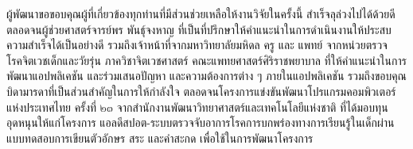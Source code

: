 \documentclass[12pt,oneside,openright,a4paper]{cpe-thai-project}
\begin{document}
\preface
ผู้พัฒนาขอขอบคุณผู้ที่เกี่ยวข้องทุกท่านที่มีส่วนช่วยเหลือให้งานวิจัยในครั้งนี้ สำเร็จลุล่วงไปได้ด้วยดี 
ตลอดจนผู้ช่วยศาสตร์จารย์พร พันธุ์จงหาญ ที่เป็นที่ปรึกษาให้คำแนะนำในการดำเนินงานให้ประสบความสำเร็จได้เป็นอย่างดี 
รวมถึงเจ้าหน้าที่จากมหาวิทยาลัยมหิดล ครู และ แพทย์ จากหน่วยตรวจโรคจิตเวชเด็กและวัยรุ่น ภาควิชาจิตเวชศาสตร์ คณะแพทยศาสตร์ศิริราชพยาบาล
 ที่ให้คำแนะนำในการพัฒนาแอปพลิเคชัน และร่วมเสนอปัญหา และความต้องการต่าง ๆ ภายในแอปพลิเคชัน  รวมถึงขอบคุณบิดามารดาที่เป็นส่วนสำคัญในการให้กำลังใจ ตลอดจนโครงการแข่งขันพัฒนาโปรแกรมคอมพิวเตอร์แห่งประเทศไทย ครั้งที่ ๒๓ 
จากสำนักงานพัฒนาวิทยาศาสตร์และเทคโนโลยีแห่งชาติ ที่ได้มอบทุนอุดหนุนให้แก่โครงการ แอลดีสปอต-ระบบตรวจจับอาการโรคการบกพร่องทางการเรียนรู้ในเด็กผ่านแบบทดสอบการเขียนตัวอักษร สระ และคำสะกด เพื่อใช้ในการพัฒนาโครงการ

\tableofcontents                    
\listoftables
\listoffigures                      

\end{document}
